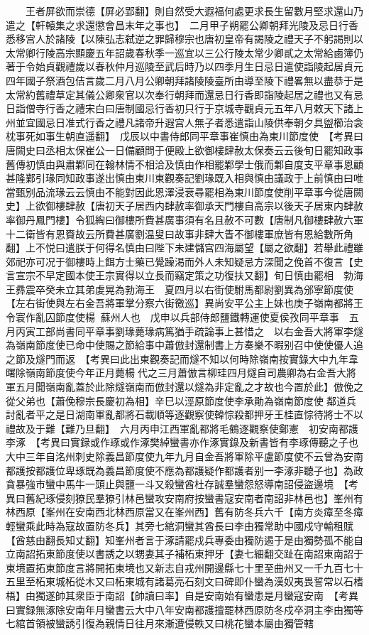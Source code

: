 　　王者屏欲而崇德【屏必郢翻】則自然受大遐福何處更求長生留數月堅求還山乃遣之【軒轅集之求還懲會昌末年之事也】　二月甲子朔罷公卿朝拜光陵及忌日行香悉移宫人於諸陵【以陳弘志弑逆之罪歸穆宗也唐初皇帝有謁陵之禮天子不躬謁則以太常卿行陵高宗顯慶五年詔歲春秋季一巡宜以三公行陵太常少卿貳之太常給鹵簿仍著于令始貞觀禮歲以春秋仲月巡陵至武后時乃以四季月生日忌日遣使詣陵起居貞元四年國子祭酒包佶言歲二月八月公卿朝拜諸陵陵臺所由導至陵下禮畧無以盡恭于是太常約舊禮草定其儀公卿衆官以次奉行朝拜而還忌日行香即詣陵起居之禮也又有忌日詣僧寺行香之禮宋白曰唐制國忌行香初只行于京城寺觀貞元五年八月敕天下諸上州並宜國忌日准式行香之禮凡諸帝升遐宫人無子者悉遣詣山陵供奉朝夕具盥櫛治衾枕事死如事生朝直遥翻】　戊辰以中書侍郎同平章事崔慎由為東川節度使　【考異曰唐闕史曰丞相太保崔公一日備顧問于便殿上欲御樓肆赦太保奏云云後旬日罷知政事舊傳初慎由與肅鄴同在翰林情不相洽及慎由作相罷鄴學士俄而鄴自度支平章事恩顧甚隆鄴引瑑同知政事遂出慎由東川東觀奏記劉瑑既入相與慎由議政于上前慎由曰唯當甄别品流瑑云云慎由不能對因此恩澤浸衰尋罷相為東川節度使削平章事今從唐闕史】上欲御樓肆赦【唐初天子居西内肆赦率御承天門樓自高宗以後天子居東内肆赦率御丹鳳門樓】令狐綯曰御樓所費甚廣事須有名且赦不可數【唐制凡御樓肆赦六軍十二衛皆有恩賚故云所費甚廣劉温叟曰故事非肆大眚不御樓軍庶皆有恩給數所角翻】上不悦曰遣朕于何得名慎由曰陛下未建儲宫四海屬望【屬之欲翻】若舉此禮雖郊祀亦可况于御樓時上餌方士藥已覺躁渇而外人未知疑忌方深聞之俛首不復言【史言宣宗不早定國本使王宗實得以立長而竊定策之功復扶又翻】旬日慎由罷相　勃海王彞震卒癸未立其弟䖍晃為勃海王　夏四月以右街使駙馬都尉劉異為邠寧節度使【左右街使與左右金吾將軍掌分察六街徼巡】異尚安平公主上妹也庚子嶺南都將王令寰作亂囚節度使楊蘇州人也　戊申以兵部侍郎鹽鐵轉運使夏侯孜同平章事　五月丙寅工部尚書同平章事劉瑑薨瑑病篤猶手疏論事上甚惜之　以右金吾大將軍李燧為嶺南節度使已命中使賜之節給事中蕭倣封還制書上方奏樂不暇别召中使使優人追之節及燧門而返　【考異曰此出東觀奏記而燧不知以何時除嶺南按實錄大中九年韋曙除嶺南節度使今年正月薨楊代之三月蕭倣言柳珪四月燧自司農卿為右金吾大將軍五月聞嶺南亂蓋於此除燧嶺南而倣封還以燧為非定亂之才故也今置於此】倣俛之從父弟也【蕭俛穆宗長慶初為相】辛巳以涇原節度使李承勛為嶺南節度使鄰道兵討亂者平之是日湖南軍亂都將石載順等逐觀察使韓悰殺都押牙王桂直悰待將士不以禮故及于難【難乃旦翻】　六月丙申江西軍亂都將毛鶴逐觀察使鄭憲　初安南都護李涿　【考異曰實録或作琢或作涿樊綽蠻書亦作涿實錄及新書皆有李琢傳聽之子也大中三年自洺州刺史除義昌節度使九年九月自金吾將軍除平盧節度使不云曾為安南都護按都護位卑琢既為義昌節度使不應為都護疑作都護者别一李涿非聽子也】為政貪暴強市蠻中馬牛一頭止與鹽一斗又殺蠻酋杜存誠羣蠻怨怒導南詔侵盜邊境　【考異曰舊紀琢侵刻獠民羣獠引林邑蠻攻安南府按蠻書寇安南者南詔非林邑也】峯州有林西原【峯州在安南西北林西原當又在峯州西】舊有防冬兵六千【南方炎瘴至冬瘴輕蠻乘此時為寇故置防冬兵】其旁七綰洞蠻其酋長曰李由獨常助中國戍守輸租賦【酋慈由翻長知丈翻】知峯州者言于涿請罷戍兵專委由獨防遏于是由獨勢孤不能自立南詔拓東節度使以書誘之以甥妻其子補柘東押牙【妻七細翻交趾在南詔東南詔于東境置拓東節度言將開拓東境也又新志自戎州開邊縣七十里至曲州又一千九百七十五里至柘東城柘從木又曰柘東城有諸葛亮石刻文曰碑即仆蠻為漢奴夷畏誓常以石榰梧】由獨遂帥其衆臣于南詔【帥讀曰率】自是安南始有蠻患是月蠻寇安南　【考異曰實録無涿除安南年月蠻書云大中八年安南都護擅罷林西原防冬戍卒洞主李由獨等七綰首領被蠻誘引復為親情日往月來漸遭侵軼又曰桃花蠻本屬由獨管轄